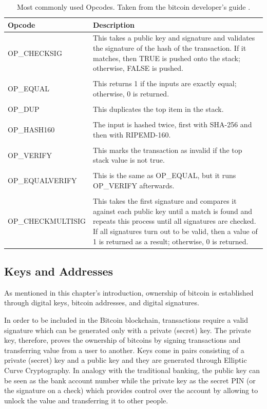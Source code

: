 \begin{table}[!ht]
\footnotesize
\begin{tabularx}{\textwidth}{l X}
\hline
\textbf{Opcode} & \textbf{Description}  \\\hline
OP\_CHECKSIG & This takes a public key and signature and validates the signature of the hash of the transaction. If it matches, then TRUE is pushed onto the stack; otherwise, FALSE is pushed.  \\
\\
OP\_EQUAL & This returns 1 if the inputs are exactly equal; otherwise, 0 is returned.  \\
\\
OP\_DUP & This duplicates the top item in the stack.  \\
\\
OP\_HASH160 & The input is hashed twice, first with SHA-256 and then with RIPEMD-160. \\
\\
OP\_VERIFY & This marks the transaction as invalid if the top stack value is not true. \\
\\
OP\_EQUALVERIFY & This is the same as OP\_EQUAL, but it runs OP\_VERIFY afterwards. \\
\\
OP\_CHECKMULTISIG & This takes the first signature and compares it against each public key until a match is found and repeats this process until all signatures are checked. If all signatures turn out to be valid, then a value of 1 is returned as a result; otherwise, 0 is returned. \\
\hline
\end{tabularx}
\caption{\footnotesize Most commonly used Opcodes. Taken from the
bitcoin developer's guide \cite{bitcoin-developer-guide}. }
\label{tab:opcode-example}
\end{table}








\subsection{Keys and Addresses}
As mentioned in this chapter's introduction, ownership of bitcoin is established
through digital keys, bitcoin addresses, and digital signatures.

In order to be included in the Bitcoin blockchain, transactions require a valid
signature which can be generated only with a private (secret) key. The private
key, therefore, proves the ownership of bitcoins by signing transactions and
transferring value from a user to another. Keys come in pairs consisting of a
private (secret) key and a public key and they are generated through Elliptic
Curve Cryptography. In analogy with the traditional banking, the public key can
be seen as the bank account number while the private key as the secret PIN (or
the signature on a check) which provides control over the account by allowing to
unlock the value and transferring it to other people.

